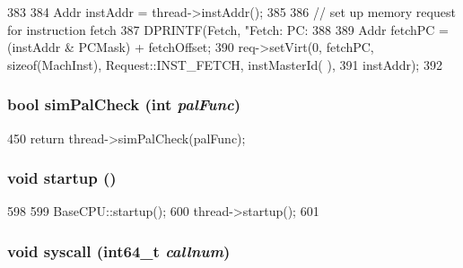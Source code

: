 \begin{DoxyCode}
383 {
384     Addr instAddr = thread->instAddr();
385 
386     // set up memory request for instruction fetch
387     DPRINTF(Fetch, "Fetch: PC:%
388 
389     Addr fetchPC = (instAddr & PCMask) + fetchOffset;
390     req->setVirt(0, fetchPC, sizeof(MachInst), Request::INST_FETCH, instMasterId(
      ),
391             instAddr);
392 }
\end{DoxyCode}
\hypertarget{classBaseSimpleCPU_a461205960be9d52e9beda48a77e9c600}{
\subsubsection[{simPalCheck}]{\setlength{\rightskip}{0pt plus 5cm}bool simPalCheck (int {\em palFunc})}}
\label{classBaseSimpleCPU_a461205960be9d52e9beda48a77e9c600}



\begin{DoxyCode}
450 { return thread->simPalCheck(palFunc); }
\end{DoxyCode}
\hypertarget{classBaseSimpleCPU_aecc7d8debf54990ffeaaed5bac7d7d81}{
\subsubsection[{startup}]{\setlength{\rightskip}{0pt plus 5cm}void startup ()}}
\label{classBaseSimpleCPU_aecc7d8debf54990ffeaaed5bac7d7d81}



\begin{DoxyCode}
598 {
599     BaseCPU::startup();
600     thread->startup();
601 }
\end{DoxyCode}
\hypertarget{classBaseSimpleCPU_a36e0b96120fcbbc2ee8699158f7be5c2}{
\subsubsection[{syscall}]{\setlength{\rightskip}{0pt plus 5cm}void syscall (int64\_\-t {\em callnum})}}
\label{classBaseSimpleCPU_a36e0b96120fcbbc2ee8699158f7be5c2}



